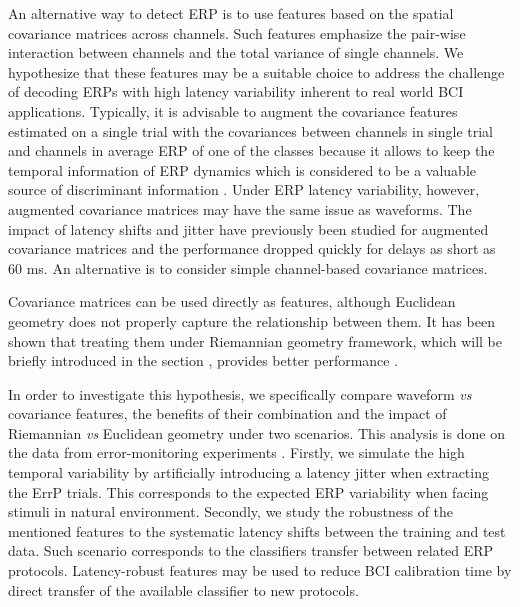 \documentclass[12pt]{iopart}
\begin{document}
An alternative way to detect ERP is to use features based on the spatial covariance matrices across channels. Such
features emphasize the pair-wise interaction
between channels and the total variance of single channels.
We hypothesize that these features may be a suitable choice
to address the challenge of decoding ERPs with high latency variability 
inherent to real world BCI applications.
Typically, it is advisable to augment the covariance features estimated
on a single trial with the covariances between channels
in single trial and channels in average ERP
of one of the classes because it allows to keep the temporal information 
of ERP dynamics which is considered to be
a valuable source of discriminant information \cite{congedo_new_2013,barachant_plug&play_2014}.
Under ERP latency variability, however, 
augmented covariance matrices may have the same issue as
waveforms.
The impact of latency shifts and jitter have previously been studied
for augmented covariance matrices \cite{barachant_plug&play_2014}
and the performance dropped quickly for delays as short as 60 ms.
An alternative is to consider simple channel-based covariance matrices.

Covariance matrices can be used directly \cite{tomioka_classifying_2007} as features, 
although Euclidean geometry does not properly capture the relationship between them.
It has been shown that treating them under Riemannian geometry framework,
which will be briefly introduced in the section ,
provides better performance \cite{barachant_classification_2013, zanini_transfer_2018}.


In order to investigate this hypothesis,
we specifically compare waveform \textit{vs} covariance features,
the benefits of their combination
and the impact of Riemannian \textit{vs} Euclidean geometry under two scenarios.
This analysis is done on the data from error-monitoring experiments \cite{iturrate_latency_2014-1}.
Firstly, we simulate the high temporal
variability by artificially introducing a latency jitter when extracting the ErrP trials.
This corresponds to the expected ERP variability when facing stimuli in
natural environment.
Secondly, we study the robustness of the mentioned features
to the systematic latency shifts between the training and test data. 
Such scenario corresponds to the classifiers transfer between
related ERP protocols. Latency-robust features may be used to reduce
BCI calibration time by direct transfer of the available classifier
to new protocols.
\end{document}
